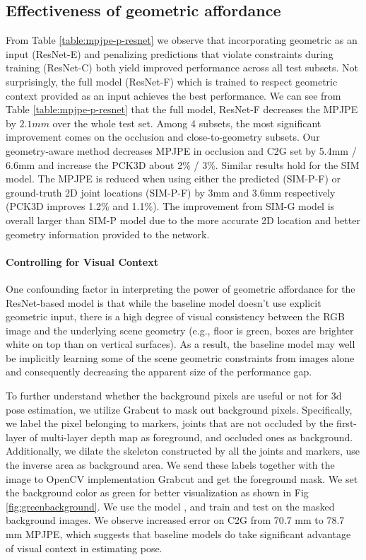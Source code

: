 \documentclass[times,referee,twocolumn,final,authoryear]{elsarticle}
\begin{document}
\subsection{Effectiveness of geometric affordance}

From Table \ref{table:mpjpe-p-resnet} we observe that incorporating geometric
as an input (ResNet-E) and penalizing predictions that violate constraints
during training (ResNet-C) both yield improved performance across all test
subsets. Not surprisingly, the full model (ResNet-F) which is trained to 
respect geometric context provided as an input achieves the best performance.
We can see from Table \ref{table:mpjpe-p-resnet} that the full model, ResNet-F decreases
the MPJPE by $2.1 mm$ over the whole test set. Among 4 subsets, the most
significant improvement comes on the occlusion and close-to-geometry subsets. Our
geometry-aware method decreases MPJPE in occlusion and C2G set by
5.4mm / 6.6mm and increase the PCK3D about 2\% / 3\%.  
Similar results hold for the SIM model.  The MPJPE is reduced when using either
the predicted (SIM-P-F) or ground-truth 2D joint locations (SIM-P-F) by 3mm
and 3.6mm respectively  (PCK3D improves 1.2\% and 1.1\%).  The improvement from 
SIM-G model is overall larger than SIM-P model due to the more accurate 2D 
location and better geometry information provided to the network. 


\paragraph{Controlling for Visual Context} 
 One confounding factor in interpreting the power of geometric affordance for
 the ResNet-based model is 
 that while the baseline model doesn't use explicit geometric input, there is 
 a high degree of visual consistency between the RGB image and the underlying 
 scene geometry (e.g., floor is green, boxes are brighter white on top than 
 on vertical surfaces). As a result, the baseline model may well be implicitly
 learning some of the scene geometric constraints from images alone and 
 consequently decreasing the apparent size of the performance gap.
 
  To further understand whether the background pixels are useful or not for 3d pose estimation, we utilize Grabcut \cite{grabcut} to mask out background pixels. Specifically, we label the pixel belonging to markers, joints that are not occluded by the first-layer of multi-layer depth map as foreground, and occluded ones as background. Additionally, we dilate the skeleton constructed by all the joints and markers, use the inverse area as background area. We send these labels together with the image to OpenCV implementation Grabcut and get the foreground mask. We set the background color as green for better visualization as shown in Fig \ref{fig:greenbackground}. We use the model \cite{rootnet}, and train and test on the masked background images. We observe increased error on C2G from 70.7 mm to 78.7 mm MPJPE, which suggests that baseline models do take significant advantage of visual context in estimating pose. 
 
\end{document}
